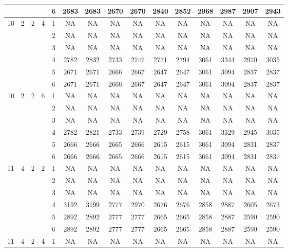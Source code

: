 \begin{longtable}{|c|c|c|c|c|c c|c c|c c|c c|c c|}
 & & & & 6 & 2683 & 2683 & 2670 & 2670 & 2840 & 2852 & 2968 & 2987 & 2907 & 2943 \\
\hline
\multirow{6}{*}{10} & \multirow{6}{*}{2} & \multirow{6}{*}{2} & \multirow{6}{*}{4} & 1 & NA & NA & NA & NA & NA & NA & NA & NA & NA & NA \\
 & & & & 2 & NA & NA & NA & NA & NA & NA & NA & NA & NA & NA \\
 & & & & 3 & NA & NA & NA & NA & NA & NA & NA & NA & NA & NA \\
 & & & & 4 & 2782 & 2832 & 2733 & 2747 & 2771 & 2794 & 3061 & 3344 & 2970 & 3035 \\
 & & & & 5 & 2671 & 2671 & 2666 & 2667 & 2647 & 2647 & 3061 & 3094 & 2837 & 2837 \\
 & & & & 6 & 2671 & 2671 & 2666 & 2667 & 2647 & 2647 & 3061 & 3094 & 2837 & 2837 \\
\hline
\multirow{6}{*}{10} & \multirow{6}{*}{2} & \multirow{6}{*}{2} & \multirow{6}{*}{6} & 1 & NA & NA & NA & NA & NA & NA & NA & NA & NA & NA \\
 & & & & 2 & NA & NA & NA & NA & NA & NA & NA & NA & NA & NA \\
 & & & & 3 & NA & NA & NA & NA & NA & NA & NA & NA & NA & NA \\
 & & & & 4 & 2782 & 2821 & 2733 & 2739 & 2729 & 2758 & 3061 & 3329 & 2945 & 3035 \\
 & & & & 5 & 2666 & 2666 & 2665 & 2666 & 2615 & 2615 & 3061 & 3094 & 2831 & 2837 \\
 & & & & 6 & 2666 & 2666 & 2665 & 2666 & 2615 & 2615 & 3061 & 3094 & 2831 & 2837 \\
\hline
\multirow{6}{*}{11} & \multirow{6}{*}{4} & \multirow{6}{*}{2} & \multirow{6}{*}{2} & 1 & NA & NA & NA & NA & NA & NA & NA & NA & NA & NA \\
 & & & & 2 & NA & NA & NA & NA & NA & NA & NA & NA & NA & NA \\
 & & & & 3 & NA & NA & NA & NA & NA & NA & NA & NA & NA & NA \\
 & & & & 4 & 3192 & 3199 & 2777 & 2970 & 2676 & 2676 & 2858 & 2887 & 2605 & 2673 \\
 & & & & 5 & 2892 & 2892 & 2777 & 2777 & 2665 & 2665 & 2858 & 2887 & 2590 & 2590 \\
 & & & & 6 & 2892 & 2892 & 2777 & 2777 & 2665 & 2665 & 2858 & 2887 & 2590 & 2590 \\
\hline
\multirow{6}{*}{11} & \multirow{6}{*}{4} & \multirow{6}{*}{2} & \multirow{6}{*}{4} & 1 & NA & NA & NA & NA & NA & NA & NA & NA & NA & NA \\

\end{longtable}
